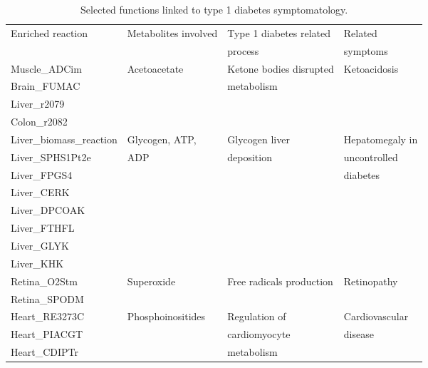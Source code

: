 \begin{table}[h]
\caption[Selected functions linked to type 1 diabetes symptomatology.]{Selected functions linked to type 1 diabetes symptomatology.}
\begin{center}
	\begin{tabular*}{\textwidth}{l @{\extracolsep{\fill}} lll}
	\hline
	Enriched reaction & Metabolites involved  & Type 1 diabetes related & Related        \\ 
	& & process & symptoms \\
	\hline
	Muscle\_ADCim            & Acetoacetate          & Ketone bodies disrupted  & Ketoacidosis\\
	Brain\_FUMAC             & & metabolism & \\
	Liver\_r2079             &         &     &    \\
	Colon\_r2082             & & & \\\cmidrule{1-4}
	Liver\_biomass\_reaction & Glycogen, ATP, & Glycogen liver     & Hepatomegaly in   \\
	Liver\_SPHS1Pt2e         & ADP       &    deposition   & uncontrolled \\
	Liver\_FPGS4             & & & diabetes\\
    Liver\_CERK              &        &     &   \\
    Liver\_DPCOAK            & & & \\
	Liver\_FTHFL             &         &   &      \\
	Liver\_GLYK 			 & & & \\
	Liver\_KHK               &        &        & \\\cmidrule{1-4}
	Retina\_O2Stm            & Superoxide & Free radicals production & Retinopathy \\
	Retina\_SPODM            & & & \\\cmidrule{1-4}
	Heart\_RE3273C           & Phosphoinositides & Regulation of & Cardiovascular \\
	Heart\_PIACGT 			 & & cardiomyocyte & disease\\
	Heart\_CDIPTr 			 & & metabolism & \\
	\hline
	\end{tabular*}
\end{center}
\label{GIM:tbls4}%
\end{table}


